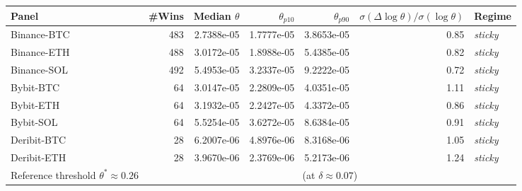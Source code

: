 \begin{tabular}{@{}lrrrrrl@{}}
\toprule
Panel & \#Wins & Median $\theta$ & $\theta_{p10}$ & $\theta_{p90}$ & $\sigma(\Delta\!\log\theta)/\sigma(\log\theta)$ & Regime \\
\midrule
Binance-BTC & 483 & 2.7388e-05 & 1.7777e-05 & 3.8653e-05 & 0.85 & \emph{sticky} \\
Binance-ETH & 488 & 3.0172e-05 & 1.8988e-05 & 5.4385e-05 & 0.82 & \emph{sticky} \\
Binance-SOL & 492 & 5.4953e-05 & 3.2337e-05 & 9.2222e-05 & 0.72 & \emph{sticky} \\
Bybit-BTC & 64 & 3.0147e-05 & 2.2809e-05 & 4.0351e-05 & 1.11 & \emph{sticky} \\
Bybit-ETH & 64 & 3.1932e-05 & 2.2427e-05 & 4.3372e-05 & 0.86 & \emph{sticky} \\
Bybit-SOL & 64 & 5.5254e-05 & 3.6272e-05 & 8.6384e-05 & 0.91 & \emph{sticky} \\
Deribit-BTC & 28 & 6.2007e-06 & 4.8976e-06 & 8.3168e-06 & 1.05 & \emph{sticky} \\
Deribit-ETH & 28 & 3.9670e-06 & 2.3769e-06 & 5.2173e-06 & 1.24 & \emph{sticky} \\
\midrule
Reference threshold $\theta^{*} \approx 0.26$ & \multicolumn{6}{c}{(at $\delta \approx 0.07$)} \\
\bottomrule
\end{tabular}